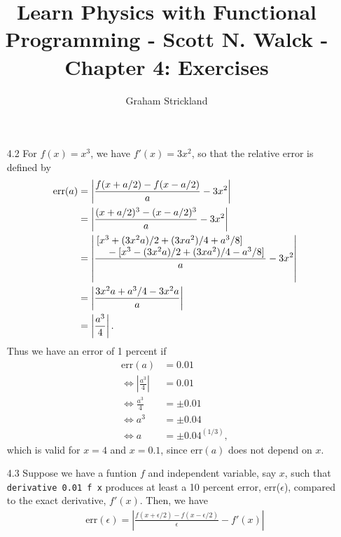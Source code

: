 \documentclass{article}
\title{Learn Physics with Functional Programming - Scott N. Walck - Chapter 4: Exercises}
\author{Graham Strickland}
\begin{document}
\maketitle  

\begin{itemize}
    \item[4.2]
    For $f(x) = x^3$, we have $f'(x) = 3x^2$, so that the relative error is defined by
    \begin{equation*}
        \begin{split}
            \text{err}(a) &= \left| \frac{f(x + a/2) - f(x - a/2)}{a} - 3x^2 \right| \\
            &= \left| \frac{(x + a/2)^3 - (x - a/2)^3}{a} - 3x^2 \right| \\
            &= \left| \frac{\splitfrac{[x^3 + (3x^2a)/2 + (3xa^2)/4 + a^3/8]}
                {{} - [x^3 - (3x^2a)/2 + (3xa^2)/4 - a^3/8]}}{a} - 3x^2 \right| \\
            &= \left| \frac{3x^2a + a^3/4 - 3x^2a}{a} \right| \\
            &= \left| \frac{a^3}{4} \right|.
        \end{split}
    \end{equation*}
    \qquad Thus we have an error of 1 percent if 
    \begin{equation*}
        \begin{split}
            \text{err}(a) &= 0.01 \\
            \Leftrightarrow \left|\frac{a^3}{4}\right| &= 0.01 \\
            \Leftrightarrow \frac{a^3}{4} &= \pm 0.01 \\
            \Leftrightarrow a^3 &= \pm 0.04 \\
            \Leftrightarrow a &= \pm {0.04}^{(1/3)},
        \end{split}
    \end{equation*}
    which is valid for $x = 4$ and $x = 0.1$, since $\text{err}(a)$ does not depend on $x$.
    \item[4.3]  %
    Suppose we have a funtion $f$ and independent variable, say $x$, such that 
    \verb|derivative 0.01 f x| produces at least a 10 percent error, err($\epsilon$), compared to 
    the exact derivative, $f'(x)$. Then, we have
    \begin{equation*}
        \begin{split}
            \text{err}(\epsilon) = \left| \frac{f(x + \epsilon/2) - f(x - \epsilon/2)}{\epsilon} - 
            f'(x) \right|

\end{split}
\end{equation*}
\end{itemize}
\end{document}
